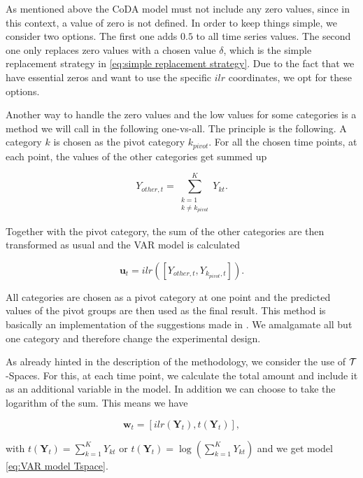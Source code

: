 As mentioned above the CoDA model must not include any zero values, since in this context, a value of zero is not defined. In order to keep things simple, we consider two options. The first one adds $0.5$ to all time series values. The second one only replaces zero values with a chosen value $\delta$, which is the simple replacement strategy in \ref{eq:simple replacement strategy}. Due to the fact that we have essential zeros and want to use the specific $ilr$ coordinates, we opt for these options. 

Another way to handle the zero values and the low values for some categories is a method we will call in the following one-vs-all. The principle is the following. A category $k$ is chosen as the pivot category $k_{pivot}$. For all the chosen time points, at each point, the values of the other categories get summed up

\begin{equation}
Y_{other,t} = \sum_{\substack{k=1 \\ k \neq k_{pivot}}}^K Y_{kt}.
\label{eq:one vs all}
\end{equation}

Together with the pivot category, the sum of the other categories are then transformed as usual and the VAR model is calculated 

\begin{equation}
\bm{u}_t = ilr([Y_{other,t}, Y_{k_{pivot},t}]).
\label{eq:one vs all ilr}
\end{equation}


All categories are chosen as a pivot category at one point and the predicted values of the pivot groups are then used as the final result. This method is basically an implementation of the suggestions made in \cite{Aitchison:2003}. We amalgamate all but one category and therefore change the experimental design. 

As already hinted in the description of the methodology, we consider the use of $\mathcal{T}$-Spaces. For this, at each time point, we calculate the total amount and include it as an additional variable in the model. In addition we can choose to take the logarithm of the sum. This means we have 

\begin{equation}
\bm{w}_t = [ilr(\bm{Y}_t),t(\bm{Y}_t)],
\label{eq:Tspace u}
\end{equation}

with $t(\bm{Y}_t) = \sum_{k=1}^K Y_{kt}$ or $t(\bm{Y}_t) = \log\left(\sum_{k=1}^K Y_{kt}\right)$ and we get model \ref{eq:VAR model Tspace}.

